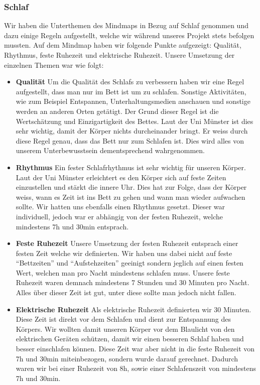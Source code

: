 \subsubsection{Schlaf}
Wir haben die Unterthemen des Mindmaps in Bezug auf Schlaf genommen und dazu einige Regeln aufgestellt, welche wir während unseres Projekt stets befolgen mussten. 
\newline
Auf dem Mindmap haben wir folgende Punkte aufgezeigt: Qualität, Rhythmus, feste Ruhezeit und elektrische Ruhezeit. 
\newline
\newline
Unsere Umsetzung der einzelnen Themen war wie folgt:
\begin{itemize}
  \item \textbf{Qualität}
  \newline
  Um die Qualität des Schlafs zu verbessern haben wir eine Regel aufgestellt, dass man nur im Bett ist um zu schlafen. Sonstige Aktivitäten, wie zum Beispiel Entspannen, Unterhaltungsmedien anschauen und sonstige werden an anderen Orten getätigt. Der Grund dieser Regel ist die Wertschätzung und Einzigartigkeit des Bettes. Laut der Uni Münster ist dies sehr wichtig, damit der Körper nichts durcheinander bringt. Er weiss durch diese Regel genau, dass das Bett nur zum Schlafen ist. Dies wird alles von unserem Unterbewusstsein dementsprechend wahrgenommen. 
  \item \textbf{Rhythmus}
  \newline
  Ein fester Schlafrhythmus ist sehr wichtig für unseren Körper. Laut der Uni Münster erleichtert es den Körper sich auf feste Zeiten einzustellen und stärkt die innere Uhr. Dies hat zur Folge, dass der Körper weiss, wann es Zeit ist ins Bett zu gehen und wann man wieder aufwachen sollte. Wir hatten uns ebenfalls einen Rhythmus gesetzt. Dieser war individuell, jedoch war er abhängig von der festen Ruhezeit, welche mindestens 7h und 30min entsprach.
  \item \textbf{Feste Ruhezeit}
  \newline
  Unsere Umsetzung der festen Ruhezeit entsprach einer festen Zeit welche wir definierten. Wir haben uns dabei nicht auf feste “Bettzeiten” und “Aufstehzeiten” geeinigt sondern jeglich auf einen festen Wert, welchen man pro Nacht mindestens schlafen muss. Unsere feste Ruhezeit waren demnach mindestens 7 Stunden und 30 Minuten pro Nacht. Alles über dieser Zeit ist gut, unter diese sollte man jedoch nicht fallen. 
  \item \textbf{Elektrische Ruhezeit}
  \newline
  Als elektrische Ruhezeit definierten wir 30 Minuten. Diese Zeit ist direkt vor dem Schlafen und dient zur Entspannung des Körpers. Wir wollten damit unseren Körper vor dem Blaulicht von den elektrischen Geräten schützen, damit wir einen besseren Schlaf haben und besser einschlafen können. Diese Zeit war aber nicht in die feste Ruhezeit von 7h und 30min miteinbezogen, sondern wurde darauf gerechnet. Dadurch waren wir bei einer Ruhezeit von 8h, sowie einer Schlafenszeit von mindestens 7h und 30min.
\end{itemize}
